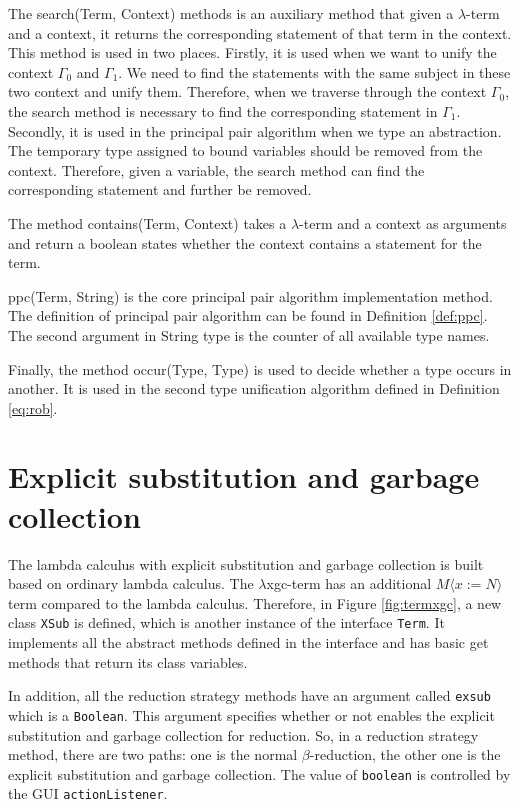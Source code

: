 The \textsf{search(Term, Context)} methods is an auxiliary method that given a $\lambda$-term and a context, it returns the corresponding statement of that term in the context. This method is used in two places. Firstly, it is used when we want to unify the context $\Gamma_0$ and $\Gamma_1$. We need to find the statements with the same subject in these two context and unify them. Therefore, when we traverse through the context $\Gamma_0$, the search method is necessary to find the corresponding statement in $\Gamma_1$. Secondly, it is used in the principal pair algorithm when we type an abstraction. The temporary type assigned to bound variables should be removed from the context. Therefore, given a variable, the search method can find the corresponding statement and further be removed.  

The method \textsf{contains(Term, Context)} takes a $\lambda$-term and a context as arguments and return a boolean states whether the context contains a statement for the term.

\textsf{ppc(Term, String)} is the core principal pair algorithm implementation method. The definition of principal pair algorithm can be found in Definition \ref{def:ppc}. The second argument in \textsf{String} type is the counter of all available type names. 

Finally, the method \textsf{occur(Type, Type)} is used to decide whether a type occurs in another. It is used in the second type unification algorithm defined in Definition \ref{eq:rob}.

\section{Explicit substitution and garbage collection}

The lambda calculus with explicit substitution and garbage collection is built based on ordinary lambda calculus. The $\lambda$xgc-term has an additional $M\langle x:=N\rangle$ term compared to the lambda calculus. Therefore, in Figure \ref{fig:termxgc}, a new class \texttt{XSub} is defined, which is another instance of the interface \texttt{Term}. It implements all the abstract methods defined in the interface and has basic get methods that return its class variables. 

In addition, all the reduction strategy methods have an argument called \texttt{exsub} which is a \texttt{Boolean}. This argument specifies whether or not enables the explicit substitution and garbage collection for reduction. So, in a reduction strategy method, there are two paths: one is the normal $\beta$-reduction, the other one is the explicit substitution and garbage collection. The value of \texttt{boolean} is controlled by the GUI \texttt{actionListener}.  

